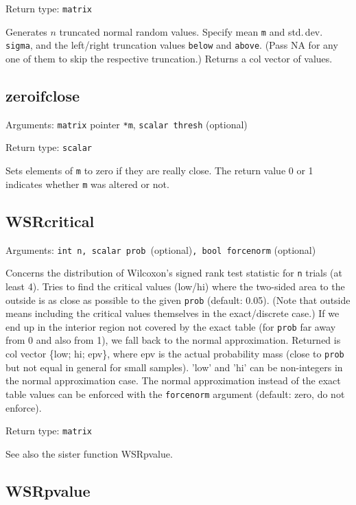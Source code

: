 \documentclass[11pt,english]{article}
\begin{document}
\noindent Return type: \texttt{matrix}

Generates $n$ truncated normal random values. Specify mean \texttt{m}
and std.\,dev. \texttt{sigma}, and the left/right truncation values
\texttt{below} and \texttt{above}. (Pass NA for any one of them to
skip the respective truncation.) Returns a col vector of values.

\subsection{zeroifclose}

Arguments: \texttt{matrix} pointer \texttt{{*}m}, \texttt{scalar thresh}
(optional) 

\noindent Return type: \texttt{scalar}

Sets elements of \texttt{m} to zero if they are really close. The
return value 0 or 1 indicates whether \texttt{m} was altered or not.

\subsection{WSRcritical }

Arguments: \texttt{int n, scalar prob }(optional)\texttt{, bool forcenorm}
(optional)

Concerns the distribution of Wilcoxon's signed rank test statistic for
\texttt{n} trials (at least 4). Tries to find the critical values
(low/hi) where the two-sided area to the outside is as close as
possible to the given \texttt{prob} (default: 0.05). (Note that
\textquotedbl outside\textquotedbl{} means including the critical
values themselves in the exact/discrete case.) If we end up in the
interior region not covered by the exact table (for \texttt{prob} far
away from 0 and also from 1), we fall back to the normal
approximation. Returned is col vector \{low; hi; epv\}, where epv is
the actual probability mass (close to \texttt{prob} but not equal in
general for small samples). 'low' and 'hi' can be non-integers in the
normal approximation case. The normal approximation instead of the
exact table values can be enforced with the \texttt{forcenorm}
argument (default: zero, do not enforce).

Return type: \texttt{matrix}

See also the sister function WSRpvalue.

\subsection{WSRpvalue}
\end{document}
